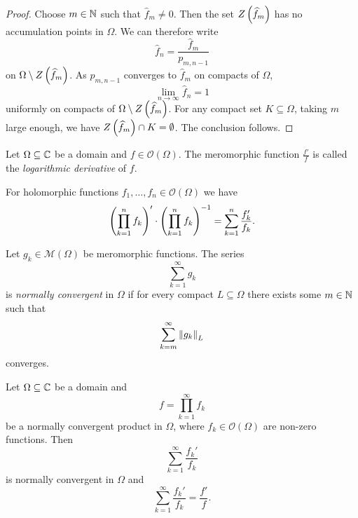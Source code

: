 \begin{proof}
Choose $m \in \mathbb{N}$ such that $\widehat{f}_m \ne 0$. Then the set
$Z \left(\widehat{f}_m\right)$ has no accumulation points in $\Omega$. We
can therefore write
\[
\widehat{f}_n = \frac{\widehat{f}_m}{p_{m,n-1}}
\]
on $\Omega \setminus Z \left(\widehat{f}_m\right)$. As $p_{m,n-1}$
converges to $\widehat{f}_m$ on compacts of $\Omega$,
\[
\lim_{n \to \infty} \widehat{f}_n = 1
\]
uniformly on compacts of $\Omega \setminus Z \left(\widehat{f}_m\right)$.
For any compact set $K \subseteq \Omega$, taking $m$ large enough,
we have $Z \left(\widehat{f}_m\right) \cap K = \emptyset$. The conclusion
follows.
\end{proof}

\begin{definicija}
Let $\Omega \subseteq \mathbb{C}$ be a domain and
$f \in \mathcal{O}(\Omega)$. The meromorphic function
$\frac{f'}{f}$ is called the
\emph{logarithmic derivative} of $f$.
\end{definicija}

\begin{opomba}
For holomorphic functions $f_1, \dots, f_n \in \mathcal{O}(\Omega)$
we have
\[
\left(\prod_{k=1}^n f_k\right)' \cdot \left(\prod_{k=1}^n f_k\right)^{-1} =
\sum_{k=1}^n \frac{f_k'}{f_k}.
\]
\end{opomba}

\begin{definicija}
Let $g_k \in \mathcal{M}(\Omega)$ be meromorphic functions. The
series
\[
\sum_{k=1}^\infty g_k
\]
is \emph{normally convergent} in $\Omega$
if for every compact $L \subseteq \Omega$ there exists some
$m \in \mathbb{N}$ such that
\[
\sum_{k=m}^\infty \left\lVert g_k\right\rVert_L
\]
converges.
\end{definicija}

\begin{izrek}
Let $\Omega \subseteq \mathbb{C}$ be a domain and
\[
f = \prod_{k=1}^\infty f_k
\]
be a normally convergent product in $\Omega$, where
$f_k \in \mathcal{O}(\Omega)$ are non-zero functions. Then
\[
\sum_{k=1}^\infty \frac{f_k'}{f_k}
\]
is normally convergent in $\Omega$ and
\[
\sum_{k=1}^\infty \frac{f_k'}{f_k} = \frac{f'}{f}.
\]
\end{izrek}

